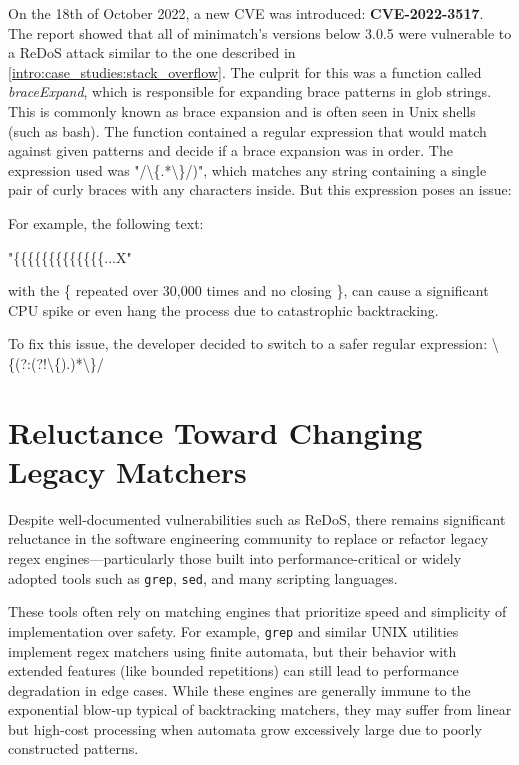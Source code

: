 On the 18th of October 2022, a new CVE was introduced: \textbf{CVE-2022-3517}.
The report showed that all of minimatch's versions below 3.0.5 were vulnerable to a ReDoS attack similar to the one described in \ref{intro:case_studies:stack_overflow}.
The culprit for this was a function called \textit{braceExpand}, which is responsible for expanding brace patterns in glob strings. This is commonly known as brace expansion and is often seen in Unix shells (such as bash). 
The function contained a regular expression that would match against given patterns and decide if a brace expansion was in order. The expression used was "/\textbackslash\{.*\textbackslash\}/)", which matches any string containing a single pair of curly braces with any characters inside. But this expression poses an issue:

For example, the following text:
\begin{center}
	"\{\{\{\{\{\{\{\{\{\{\{\{\{...X"
\end{center}

with the \{ repeated over 30,000 times and no closing \}, can cause a significant CPU spike or even hang the process due to catastrophic backtracking.

To fix this issue, the developer decided to switch to a safer regular expression: \textbackslash\{(?:(?!\textbackslash\{).)*\textbackslash\}/


\section{Reluctance Toward Changing Legacy Matchers}

Despite well-documented vulnerabilities such as ReDoS, there remains significant reluctance in the software engineering community to replace or refactor legacy regex engines—particularly those built into performance-critical or widely adopted tools such as \texttt{grep}, \texttt{sed}, and many scripting languages.

These tools often rely on matching engines that prioritize speed and simplicity of implementation over safety. For example, \texttt{grep} and similar UNIX utilities implement regex matchers using finite automata, but their behavior with extended features (like bounded repetitions) can still lead to performance degradation in edge cases. While these engines are generally immune to the exponential blow-up typical of backtracking matchers, they may suffer from linear but high-cost processing when automata grow excessively large due to poorly constructed patterns.

